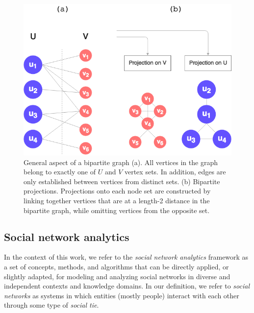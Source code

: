 \begin{figure}[h!]
  	\centering
    \includegraphics[width=0.5\linewidth]{figures/bipartite_general.png}
    \caption[General aspect of bipartite graphs and their projections.]{General aspect of a bipartite graph (a). All vertices in the graph belong to exactly one of $U$ and $V$ vertex sets. In addition, edges are only established between vertices from distinct sets. (b) Bipartite projections. Projections onto each node set are constructed by linking together vertices that are at a length-2 distance in the bipartite graph, while omitting vertices from the opposite set.}
    \label{fig:bipartite_general}
  \end{figure}



\subsection{Social network analytics}
In the context of this work, we refer to the \textit{social network analytics} framework as a set of concepts, methods, and algorithms that can be directly applied, or slightly adapted, for modeling and analyzing social networks in diverse and independent contexts and knowledge domains.
%
In our definition, we refer to \textit{social networks} as systems in which entities (mostly people) interact with each other through some type of \textit{social tie}.

